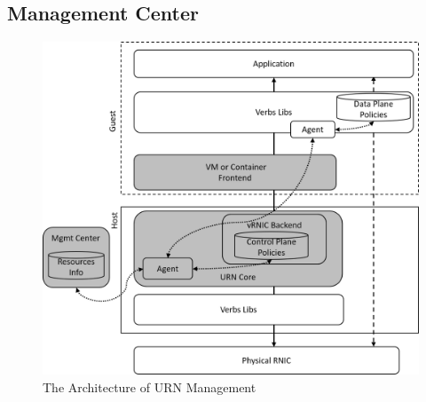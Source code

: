 \subsection{Management Center}




\begin{figure}[!ht]
	\centering
	\includegraphics[width=1\linewidth]{images/urn-interface.png}
	\caption{The Architecture of URN Management}
	\label{fig:route-config}
\end{figure}

